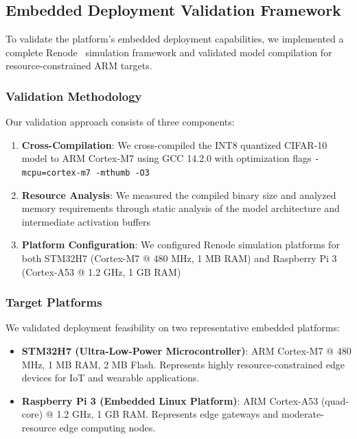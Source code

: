 

\subsection{Embedded Deployment Validation Framework}

To validate the platform's embedded deployment capabilities, we implemented
a complete Renode~\cite{renode} simulation framework and validated model
compilation for resource-constrained ARM targets.

\subsubsection{Validation Methodology}

Our validation approach consists of three components:

\begin{enumerate}
\item \textbf{Cross-Compilation}: We cross-compiled the INT8 quantized
CIFAR-10 model to ARM Cortex-M7 using GCC 14.2.0 with optimization flags
\texttt{-mcpu=cortex-m7 -mthumb -O3}

\item \textbf{Resource Analysis}: We measured the compiled binary size
and analyzed memory requirements through static analysis of the model
architecture and intermediate activation buffers

\item \textbf{Platform Configuration}: We configured Renode simulation
platforms for both STM32H7 (Cortex-M7 @ 480 MHz, 1 MB RAM) and Raspberry
Pi 3 (Cortex-A53 @ 1.2 GHz, 1 GB RAM)
\end{enumerate}

\subsubsection{Target Platforms}

We validated deployment feasibility on two representative embedded platforms:

\begin{itemize}
\item \textbf{STM32H7 (Ultra-Low-Power Microcontroller)}:
  ARM Cortex-M7 @ 480 MHz, 1 MB RAM, 2 MB Flash. Represents highly
  resource-constrained edge devices for IoT and wearable applications.

\item \textbf{Raspberry Pi 3 (Embedded Linux Platform)}:
  ARM Cortex-A53 (quad-core) @ 1.2 GHz, 1 GB RAM. Represents edge
  gateways and moderate-resource edge computing nodes.
\end{itemize}

